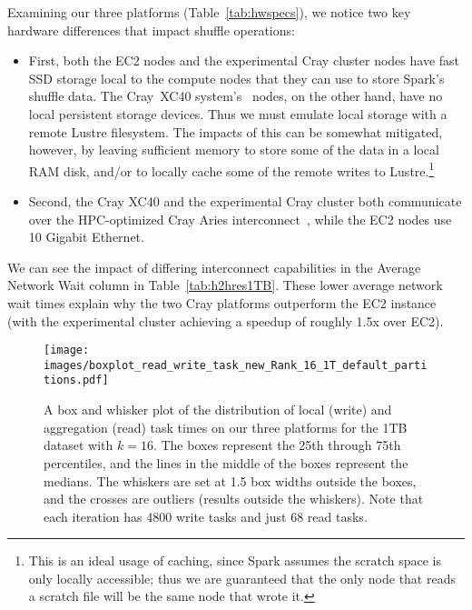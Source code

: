Examining our three platforms (Table~\ref{tab:hwspecs}), we notice two key hardware differences that impact shuffle operations:
\begin{itemize}
\item First, both the EC2 nodes and the experimental Cray cluster nodes have fast SSD storage local to the compute nodes that they can use to store Spark's shuffle data.  
The Cray{\textsuperscript{\tiny\textregistered}}~XC40{\textsuperscript{\tiny\texttrademark}} system's~\cite{alverson2012cray,craycascadesc12} nodes, on the other hand, have no local persistent storage devices.  Thus we must emulate local storage with a remote Lustre filesystem.  The impacts of this can be somewhat mitigated, however, by leaving sufficient memory to store some of the data in a local RAM disk, and/or to locally cache some of the remote writes to Lustre.\footnote{This is an ideal usage of caching, since Spark assumes the scratch space is only locally accessible; thus we are guaranteed that the only node that reads a scratch file will be the same node that wrote it.}
\item Second, the Cray XC40 and the experimental Cray cluster both communicate over the HPC-optimized Cray Aries 
interconnect~\cite{alverson2012cray,craycascadesc12}, while the EC2 nodes use 10 Gigabit Ethernet.
\end{itemize}  
We can see the impact of differing interconnect capabilities in the Average Network Wait column in Table~\ref{tab:h2hres1TB}.   These lower average network wait times explain why the two Cray platforms outperform the EC2 instance (with the experimental cluster achieving a speedup of roughly 1.5x over EC2).  

   \begin{figure}
    \begin{centering}
    \texttt{[image: images/boxplot\_read\_write\_task\_new\_Rank\_16\_1T\_default\_partitions.pdf]}
    \end{centering}
    \caption{A box and whisker plot of the distribution of local (write) and aggregation (read) task times on our three platforms for the 1TB dataset with $k=16$.  The boxes represent the 25th through 75th percentiles, and the lines in the middle of the boxes represent the medians.  The whiskers are set at 1.5 box widths outside the boxes, and the crosses are outliers (results outside the whiskers).  Note that each iteration has 4800 write tasks and just 68 read tasks.}
    \label{fig:rwtaskdist} 
    \end{figure}


